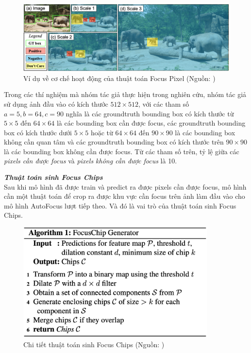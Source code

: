 {    \begin{figure}[H]
        \centering
        \includegraphics[width=15cm] {images/autofocus_focus_pixel}
        \caption{Ví dụ về cơ chế hoạt động của thuật toán Focus Pixel  (Nguồn: \cite{najibi2019autofocus})}
        \label{fig:autofocus_focus_pixel}
    \end{figure}

    \noindent
    Trong các thí nghiệm mà nhóm tác giả thực hiện trong nghiên cứu, nhóm tác giả sử dụng ảnh đầu vào có kích thước $512 \times 512$, với các tham số $a = 5, b = 64, c = 90$ nghĩa là các groundtruth  bounding box  có kích thước từ $5 \times 5$ đến $64 \times 64$ là các bounding box  cần được focus, các groundtruth  bounding box  có kích thước dưới $5 \times 5$ hoặc từ $64 \times 64$ đến $90 \times 90$ là các bounding box  không cần quan tâm và các groundtruth  bounding box  có kích thước trên $90 \times 90$ là các bounding box  không cần được focus.
    Từ các tham số trên, tỷ lệ giữa các \textit{pixels  cần được focus} và \textit{pixels  không cần được focus} là 10.

    \noindent
    \textbf{\textit{Thuật toán sinh Focus Chips}} \\
    Sau khi mô hình đã được train và predict ra được pixels  cần được focus, mô hình cần một thuật toán để crop ra được khu vực cần focus trên ảnh làm đầu vào cho mô hình AutoFocus  lượt tiếp theo.
    Và đó là vai trò của thuật toán sinh Focus Chips.

    \begin{figure}[H]
        \centering
        \includegraphics[width=10cm] {images/autofocus_focus_chip_gen}
        \caption{Chi tiết thuật toán sinh Focus Chips (Nguồn: \cite{najibi2019autofocus})}
        \label{fig:autofocus_focus_chip_gen}
    \end{figure}

}
